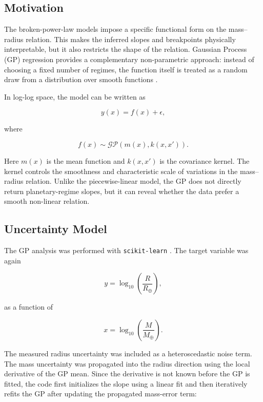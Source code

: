 \documentclass{article}
\numberwithin{equation}{section}
\begin{document}
\subsection{Motivation}

The broken-power-law models impose a specific functional form on the mass--radius relation. This makes the inferred slopes and breakpoints physically interpretable, but it also restricts the shape of the relation. Gaussian Process (GP) regression provides a complementary non-parametric approach: instead of choosing a fixed number of regimes, the function itself is treated as a random draw from a distribution over smooth functions \cite{rasmussen2006gaussian}.

In log-log space, the model can be written as

\begin{equation}
y(x) = f(x) + \epsilon,
\end{equation}

where

\begin{equation}
f(x) \sim \mathcal{GP}\left(m(x), k(x,x')\right).
\end{equation}

Here $m(x)$ is the mean function and $k(x,x')$ is the covariance kernel. The kernel controls the smoothness and characteristic scale of variations in the mass--radius relation. Unlike the piecewise-linear model, the GP does not directly return planetary-regime slopes, but it can reveal whether the data prefer a smooth non-linear relation.

\subsection{Uncertainty Model}

The GP analysis was performed with \texttt{scikit-learn} \cite{pedregosa2011scikit}. The target variable was again

\begin{equation}
y = \log_{10}\left(\frac{R}{R_\oplus}\right),
\end{equation}

as a function of

\begin{equation}
x = \log_{10}\left(\frac{M}{M_\oplus}\right).
\end{equation}

The measured radius uncertainty was included as a heteroscedastic noise term. The mass uncertainty was propagated into the radius direction using the local derivative of the GP mean. Since the derivative is not known before the GP is fitted, the code first initializes the slope using a linear fit and then iteratively refits the GP after updating the propagated mass-error term:
\end{document}
